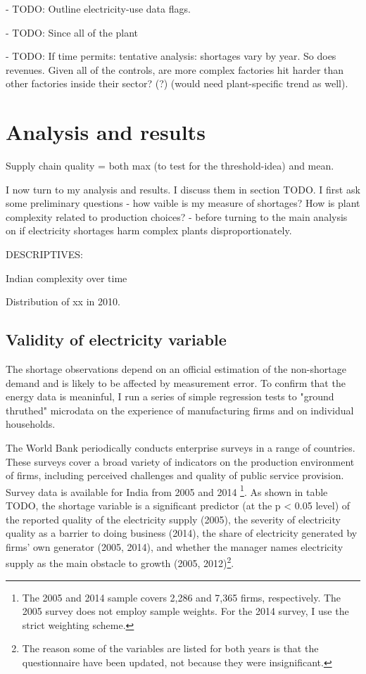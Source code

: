 \documentclass[11pt]{article}
\begin{document}
- TODO: Outline electricity-use data flags.

- TODO: Since all of the plant

- TODO: If time permits: tentative analysis: shortages vary by year. So does revenues. Given all of the controls, are more complex factories hit harder than other factories inside their sector? (?) (would need plant-specific trend as well).


\newpage

\section{Analysis and results}%
\label{sec:analysis_and_results}
Supply chain quality = both max (to test for the threshold-idea) and mean.

I now turn to my analysis and results. I discuss them in section TODO. I first ask some preliminary questions - how vaible is my measure of shortages? How is plant complexity related to production choices? - before turning to the main analysis on if electricity shortages harm complex plants disproportionately. 

DESCRIPTIVES:

Indian complexity over time

Distribution of xx in 2010. 

\subsection{Validity of electricity variable}%
\label{sub:validity_of_electricity_variable}

The shortage observations depend on an official estimation of the non-shortage demand and is likely to be affected by measurement error. To confirm that the energy data is meaninful, I run a series of simple regression tests to "ground thruthed" microdata on the experience of manufacturing firms and on individual households. 

The World Bank periodically conducts enterprise surveys in a range of countries. These surveys cover a broad variety of indicators on the production environment of firms, including perceived challenges and quality of public service provision. Survey data is available for India from 2005 and 2014 \citep{world_bank_enterprise_2020-1,world_bank_enterprise_2020-2}\footnote{The 2005 and 2014 sample covers 2,286 and 7,365 firms, respectively. The 2005 survey does not employ sample weights. For the 2014 survey, I use the strict weighting scheme.}. As shown in table TODO, the shortage variable is a significant predictor (at the p < 0.05 level) of the reported quality of the electricity supply (2005), the severity of electricity quality as a barrier to doing business (2014), the share of electricity generated by firms' own generator (2005, 2014), and whether the manager names electricity supply as the main obstacle to growth (2005, 2012)\footnote{The reason some of the variables are listed for both years is that the questionnaire have been updated, not because they were insignificant.}.
\end{document}

